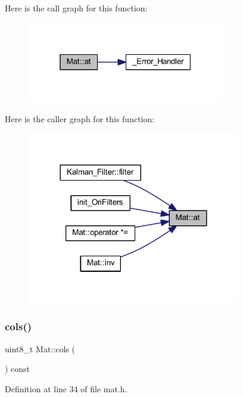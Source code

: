 Here is the call graph for this function\+:
\nopagebreak
\begin{figure}[H]
\begin{center}
\leavevmode
\includegraphics[width=244pt]{class_mat_a5f4b8f7e3c55a1caf7161c11ec2a2465_cgraph}
\end{center}
\end{figure}
Here is the caller graph for this function\+:
\nopagebreak
\begin{figure}[H]
\begin{center}
\leavevmode
\includegraphics[width=264pt]{class_mat_a5f4b8f7e3c55a1caf7161c11ec2a2465_icgraph}
\end{center}
\end{figure}
\mbox{\label{class_mat_a88332d9cd088208e24bea1f10651d1e7}} 
\subsubsection{\texorpdfstring{cols()}{cols()}}
{\footnotesize\ttfamily uint8\+\_\+t Mat\+::cols (\begin{DoxyParamCaption}{ }\end{DoxyParamCaption}) const\hspace{0.3cm}{\ttfamily [inline]}}



Definition at line 34 of file mat.\+h.

